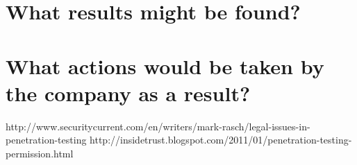 \documentclass{article}
\begin{document}
\section{What results might be found? }

\section{What actions would be taken by the company as a result?}

\begin{thebibliography}{1}
        http://www.securitycurrent.com/en/writers/mark-rasch/legal-issues-in-penetration-testing
     http://insidetrust.blogspot.com/2011/01/penetration-testing-permission.html
\end{thebibliography}
\end{document}

